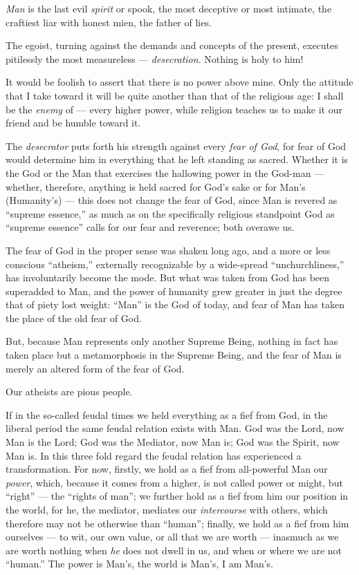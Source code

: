 \textit{Man} is the last evil \textit{spirit} or spook, the most deceptive or 
most intimate, the craftiest liar with honest mien, the father of lies.

The egoist, turning against the demands and concepts of the present, executes 
pitilessly the most measureless --- \textit{desecration}. Nothing is holy to 
him!

It would be foolish to assert that there is no power above mine. Only the 
attitude that I take toward it will be quite another than that of the 
religious age: I shall be the \textit{enemy} of --- every higher power, while 
religion teaches us to make it our friend and be humble toward it.

The \textit{desecrator} puts forth his strength against every \textit{fear of 
God}, for fear of God would determine him in everything that he left standing 
as sacred. Whether it is the God or the Man that exercises the hallowing power 
in the God-man --- whether, therefore, anything is held sacred for God's sake 
or for Man's (Humanity's) --- this does not change the fear of God, since Man 
is revered as ``supreme essence,'' as much as on the specifically religious 
standpoint God as ``supreme essence'' calls for our fear and reverence; both 
overawe us.

The fear of God in the proper sense was shaken long ago, and a more or less 
conscious ``atheism,'' externally recognizable by a wide-spread 
``unchurchliness,'' has involuntarily become the mode. But what was taken 
from God has been superadded to Man, and the power of humanity grew greater in 
just the degree that of piety lost weight: ``Man'' is the God of today, and 
fear of Man has taken the place of the old fear of God.

But, because Man represents only another Supreme Being, nothing in fact has 
taken place but a metamorphosis in the Supreme Being, and the fear of Man is 
merely an altered form of the fear of God.

Our atheists are pious people.

If in the so-called feudal times we held everything as a fief from God, in the 
liberal period the same feudal relation exists with Man. God was the Lord, now 
Man is the Lord; God was the Mediator, now Man is; God was the Spirit, now Man 
is. In this three fold regard the feudal relation has experienced a 
transformation. For now, firstly, we hold as a fief from all-powerful Man our 
\textit{power}, which, because it comes from a higher, is not called power or 
might, but ``right'' --- the ``rights of man''; we further hold as a fief 
from him our position in the world, for he, the mediator, mediates our 
\textit{intercourse} with others, which therefore may not be otherwise than 
``human''; finally, we hold as a fief from him ourselves --- to wit, our own 
value, or all that we are worth --- inasmuch as we are worth nothing when 
\textit{he} does not dwell in us, and when or where we are not ``human.'' 
The power is Man's, the world is Man's, I am Man's.

